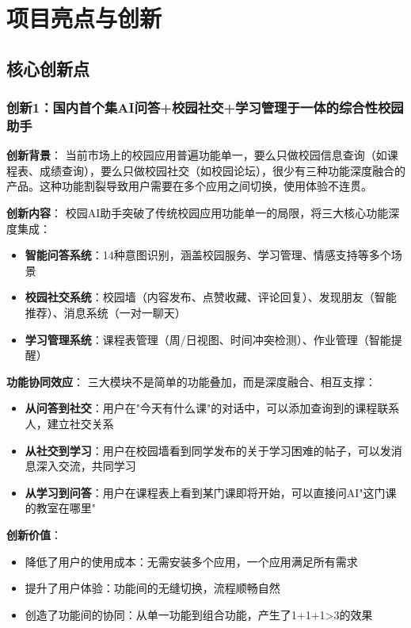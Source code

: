 \documentclass[12pt,a4paper]{article}
\begin{document}
\section{项目亮点与创新}

\subsection{核心创新点}

\subsubsection{创新1：国内首个集AI问答+校园社交+学习管理于一体的综合性校园助手}

\textbf{创新背景}：
当前市场上的校园应用普遍功能单一，要么只做校园信息查询（如课程表、成绩查询），要么只做校园社交（如校园论坛），很少有三种功能深度融合的产品。这种功能割裂导致用户需要在多个应用之间切换，使用体验不连贯。

\textbf{创新内容}：
校园AI助手突破了传统校园应用功能单一的局限，将三大核心功能深度集成：

\begin{itemize}
    \item \textbf{智能问答系统}：14种意图识别，涵盖校园服务、学习管理、情感支持等多个场景
    \item \textbf{校园社交系统}：校园墙（内容发布、点赞收藏、评论回复）、发现朋友（智能推荐）、消息系统（一对一聊天）
    \item \textbf{学习管理系统}：课程表管理（周/日视图、时间冲突检测）、作业管理（智能提醒）
\end{itemize}

\textbf{功能协同效应}：
三大模块不是简单的功能叠加，而是深度融合、相互支撑：

\begin{itemize}
    \item \textbf{从问答到社交}：用户在"今天有什么课"的对话中，可以添加查询到的课程联系人，建立社交关系
    \item \textbf{从社交到学习}：用户在校园墙看到同学发布的关于学习困难的帖子，可以发消息深入交流，共同学习
    \item \textbf{从学习到问答}：用户在课程表上看到某门课即将开始，可以直接问AI"这门课的教室在哪里"
\end{itemize}

\textbf{创新价值}：
\begin{itemize}
    \item 降低了用户的使用成本：无需安装多个应用，一个应用满足所有需求
    \item 提升了用户体验：功能间的无缝切换，流程顺畅自然
    \item 创造了功能间的协同：从单一功能到组合功能，产生了1+1+1>3的效果
\end{itemize}
\end{document}
